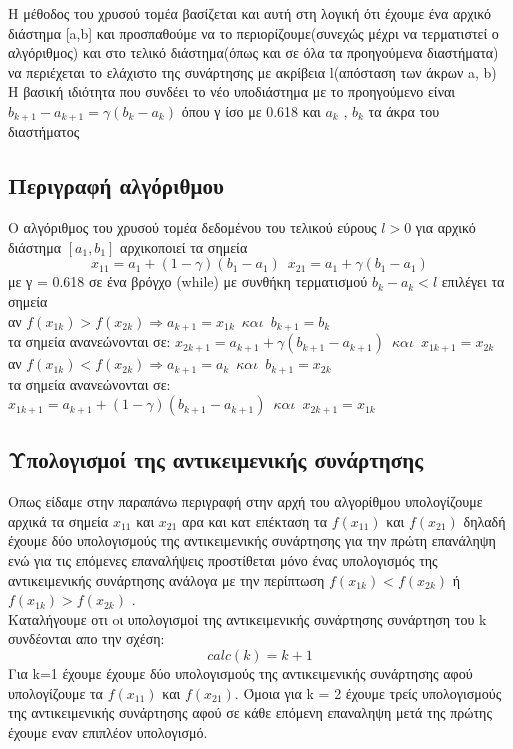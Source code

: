 \documentclass{article}
\begin{document}
Η μέθοδος του χρυσού τομέα βασίζεται και αυτή στη λογική ότι έχουμε ένα αρχικό διάστημα
[a,b] και προσπαθούμε να το περιορίζουμε(συνεχώς μέχρι να τερματιστεί ο αλγόριθμος) και στο
τελικό διάστημα(όπως και σε όλα τα προηγούμενα διαστήματα) να περιέχεται το ελάχιστο της
συνάρτησης με ακρίβεια l(απόσταση των άκρων a, b)  \\
Η βασική ιδιότητα που συνδέει το νέο
υποδιάστημα με το προηγούμενο είναι $b_{k+1}-a_{k+1}=γ(b_k -a_k)$ όπου γ ίσο με 0.618 και $a_k$ , $b_k$ τα άκρα του διαστήματος

\subsection*{Περιγραφή αλγόριθμου}
Ο αλγόριθμος του χρυσού τομέα δεδομένου του τελικού εύρους $l>0$ για αρχικό διάστημα $[a_1,b_1]$ αρχικοποιεί τα σημεία
\begin{equation*}
\boxed{x_{11} =  a_1 + (1-γ)(b_1-a_1) } \enspace \boxed{x_{21} =  a_1 + γ(b_1-a_1)} 
\end{equation*}
με γ = 0.618 σε ένα βρόγχο (while) με συνθήκη τερματισμού $\boxed{ b_k - a_k < l}$ επιλέγει τα σημεία \\
αν $\boxed{f(x_{1k}) > f(x_{2k}) \Rightarrow a_{k+1} = x_{1k} \enspace και \enspace b_{k+1} = b_{k}}$ \\
τα σημεία ανανεώνονται σε: $\boxed{x_{2k+1} = a_{k+1} + γ(b_{k+1} - a_{k+1})\enspace και\enspace x_{1k+1} = x_{2k}}$  \\
αν $\boxed{f(x_{1k}) < f(x_{2k}) \Rightarrow a_{k+1} = a_{k} \enspace και \enspace b_{k+1} = x_{2k}}$ \\
τα σημεία ανανεώνονται σε: $\boxed{x_{1k+1} = a_{k+1} + (1-γ)(b_{k+1} - a_{k+1})\enspace και\enspace x_{2k+1} = x_{1k}}$ 

 
 \subsection*{Υπολογισμοί της αντικειμενικής συνάρτησης}
Οπως είδαμε στην παραπάνω περιγραφή στην αρχή του αλγορίθμου υπολογίζουμε αρχικά τα σημεία $x_{11}$ και $x_{21}$ αρα και κατ επέκταση τα $f( x_{11})$ και $f( x_{21})$ δηλαδή έχουμε δύο υπολογισμούς της αντικειμενικής συνάρτησης για την πρώτη επανάληψη ενώ για τις επόμενες επαναλήψεις προστίθεται μόνο ένας υπολογισμός της αντικειμενικής συνάρτησης ανάλογα με την περίπτωση $f(x_{1k}) < f(x_{2k})$ ή $f(x_{1k}) > f(x_{2k})$ . \\
Kαταλήγουμε οτι oι υπολογισμοί της αντικειμενικής συνάρτησης συνάρτηση του k συνδέονται απο την σχέση:
\begin{equation*}
\boxed{calc(k) = k+1} 
\end{equation*}
Για k=1 έχουμε έχουμε δύο υπολογισμούς της αντικειμενικής συνάρτησης αφού υπολογίζουμε τα $f( x_{11})$ και $f( x_{21})$. Όμοια για k = 2 έχουμε τρείς υπολογισμούς της αντικειμενικής συνάρτησης αφού σε κάθε επόμενη επαναληψη μετά της πρώτης έχουμε εναν επιπλέον υπολογισμό. \newpage
\end{document}
